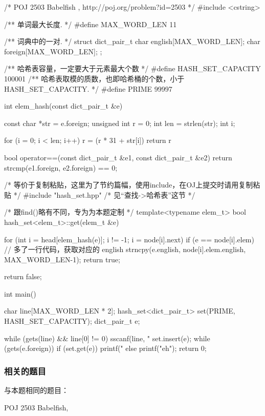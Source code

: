 \begin{Codex}[label=babelfish.cpp]
/* POJ 2503 Babelfish , http://poj.org/problem?id=2503 */
#include <cstring>

/** 单词最大长度. */
#define MAX_WORD_LEN   11

/** 词典中的一对. */
struct dict_pair_t {
    char english[MAX_WORD_LEN];
    char foreign[MAX_WORD_LEN];
};

/** 哈希表容量，一定要大于元素最大个数  */
#define HASH_SET_CAPACITY  100001
/** 哈希表取模的质数，也即哈希桶的个数，小于 HASH_SET_CAPACITY. */
#define PRIME  99997

int elem_hash(const dict_pair_t &e) {
    const char *str = e.foreign;
    unsigned int r = 0;
    int len = strlen(str);
    int i;

    for (i = 0; i < len; i++) {
        r = (r * 31 + str[i]) %
    }
    return r %
}

bool operator==(const dict_pair_t &e1, const dict_pair_t &e2) {
    return strcmp(e1.foreign, e2.foreign) == 0;
}

/* 等价于复制粘贴，这里为了节约篇幅，使用include，在OJ上提交时请用复制粘贴 */
#include "hash_set.hpp"  /* 见“查找->哈希表”这节 */

/* 跟find()略有不同，专为为本题定制 */
template<typename elem_t>
bool hash_set<elem_t>::get(elem_t &e) {
    for (int i = head[elem_hash(e)]; i != -1; i = node[i].next)
        if (e == node[i].elem) {
            // 多了一行代码，获取对应的 english
            strncpy(e.english, node[i].elem.english, MAX_WORD_LEN-1);
            return true;
        }

    return false;
}


int main() {
    char line[MAX_WORD_LEN * 2];
    hash_set<dict_pair_t> set(PRIME, HASH_SET_CAPACITY);
    dict_pair_t e;

    while (gets(line) && line[0] != 0) {
        sscanf(line, "%
        set.insert(e);
    }
    while (gets(e.foreign)) {
        if (set.get(e)) printf("%
        else printf("eh\n");
    }
    return 0;
}
\end{Codex}


\subsubsection{相关的题目}
与本题相同的题目：
\begindot
\item POJ 2503 Babelfish, 
\myenddot

